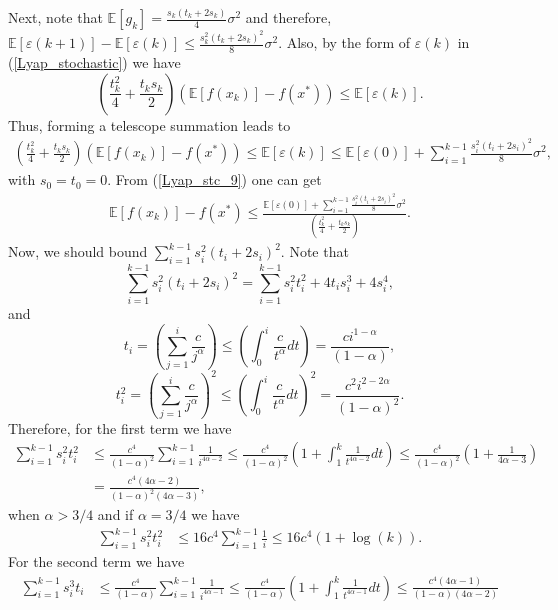 \documentclass{article}
\theoremstyle{plain}
\theoremstyle{definition}
\theoremstyle{remark}
\begin{document}
        Next, note that $\mathbb E[g_k]= \frac{s_k(t_k+2s_k)}{4}\sigma^2$ and therefore, $\mathbb E [\varepsilon(k+1)]-\mathbb E[ \varepsilon (k)]\leq \frac{s_k^2(t_k+2s_k)^2}{8}\sigma^2$. Also, by the form of $\varepsilon(k)$ in (\ref{Lyap_stochastic}) we have $$(\frac{t_k^2}{4}+\frac{t_{k}s_k}{2})(\mathbb E[f(x_k)]-f(x^*))\leq \mathbb E[\varepsilon(k)].$$
        Thus, forming a telescope summation leads to
        \begin{align}\label{Lyap_stc_9}
            (\frac{t_k^2}{4}+\frac{t_{k}s_k}{2})(\mathbb E[f(x_k)]-f(x^*))\leq\mathbb E[\varepsilon(k)]\leq \mathbb E[\varepsilon(0)] + \sum_{i=1}^{k-1} \frac{s_i^2(t_i+2s_i)^2}{8}\sigma^2,
        \end{align}
        with $s_0=t_0=0$. From (\ref{Lyap_stc_9}) one can get
        \begin{align}\label{Lyap_stc_10}
            \mathbb E[f(x_k)]-f(x^*) \leq \frac{\mathbb E[\varepsilon(0)] + \sum_{i=1}^{k-1} \frac{s_i^2(t_i+2s_i)^2}{8}\sigma^2}{(\frac{t_k^2}{4}+\frac{t_{k}s_k}{2})}.
        \end{align}
        Now, we should bound $\sum_{i=1}^{k-1} s_i^2(t_i+2s_i)^2$. Note that 
        $$\sum_{i=1}^{k-1} s_i^2(t_i+2s_i)^2=\sum_{i=1}^{k-1} s_i^2t_i^2+4t_is_i^3+4s_i^4,$$
        and
        $$t_i=\left(\sum_{j=1}^i\frac{c}{j^{\alpha}}\right)\leq \left(\int_{0}^{i} \frac{c}{t^{\alpha}}dt\right)=\frac{ci^{1-\alpha}}{(1-\alpha)},$$
        $$t_i^2=\left(\sum_{j=1}^i\frac{c}{j^{\alpha}}\right)^2\leq \left(\int_{0}^{i} \frac{c}{t^{\alpha}}dt\right)^2=\frac{c^2i^{2-2\alpha}}{(1-\alpha)^2}.$$
        Therefore, for the first term we have 
        \begin{align}\label{Lyap_stc_11}
            \sum_{i=1}^{k-1} s_i^2t_i^2&\leq \frac{c^4}{(1-\alpha)^2}\sum_{i=1}^{k-1} \frac{1}{i^{4\alpha -2}}\leq \frac{c^4}{(1-\alpha)^2}(1+\int_{1}^{k} \frac{1}{t^{4\alpha -2}}dt)\leq \frac{c^4}{(1-\alpha)^2}(1+\frac{1}{4\alpha-3})\nonumber\\
            &=\frac{c^4(4\alpha -2)}{(1-\alpha)^2(4\alpha-3)},
        \end{align}
        when $\alpha > 3/4$ and if $\alpha=3/4$ we have
        \begin{align}\label{Lyap_stc_12}
            \sum_{i=1}^{k-1} s_i^2t_i^2&\leq 16c^4\sum_{i=1}^{k-1}\frac{1}{i}\leq 16c^4(1+\log (k)).
        \end{align}
        For the second term we have
        \begin{align}\label{Lyap_stc_13}
            \sum_{i=1}^{k-1} s_i^3t_i&\leq \frac{c^4}{(1-\alpha)}\sum_{i=1}^{k-1} \frac{1}{i^{4\alpha -1}}\leq \frac{c^4}{(1-\alpha)}(1+\int_1^k\frac{1}{t^{4\alpha -1}}dt)\leq \frac{c^4(4\alpha -1)}{(1-\alpha)(4\alpha -2)}
         \end{align}
\end{document}
